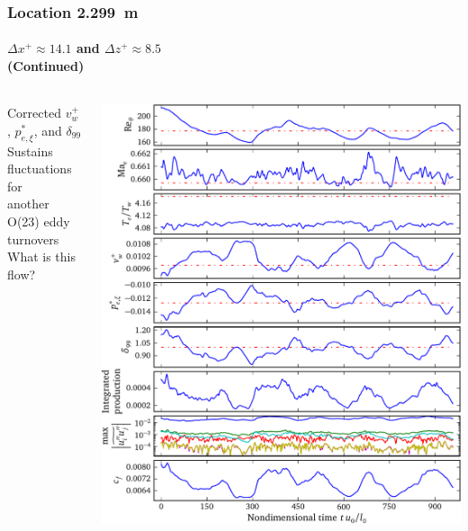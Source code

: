 \documentclass[mathserif]{beamer}
\begin{document}
\begin{frame}
    \frametitle{Location 2.299~m}
    \framesubtitle{$\Delta{}x^{+}\approx{}14.1$ and $\Delta{}z^{+}\approx{}8.5$\\
                   (Continued)}
    \begin{columns}[c,onlytextwidth]
    \begin{column}{.35\linewidth}
        \scriptsize
        Corrected $v_w^{+}$, $p_{e,\xi}^\ast$, and $\delta_{99}$
        \\\bigskip
        Sustains fluctuations for\\another O(23) eddy turnovers
        \\\bigskip
        What is this flow?
    \end{column}
    \begin{column}{.65\linewidth}
        \vspace{-5em}
        \begin{flushright}
            \includegraphics[height=0.99\textheight]{redux2299}
        \end{flushright}
    \end{column}
    \end{columns}
\end{frame}
\end{document}
